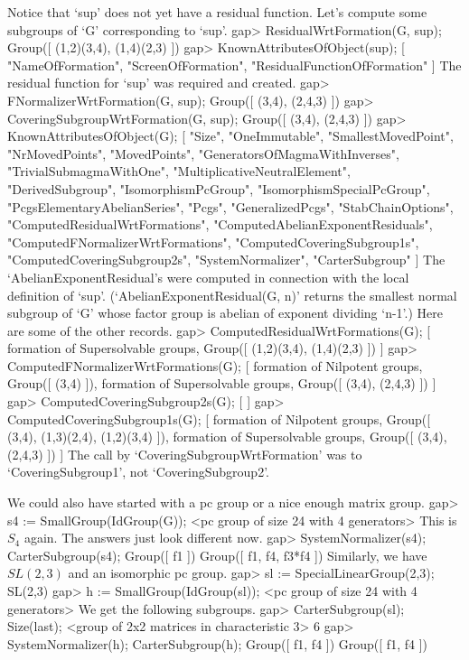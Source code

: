 Notice that `sup' does not yet have a residual function.
 Let's compute some subgroups of `G' corresponding to `sup'.
\beginexample
gap> ResidualWrtFormation(G, sup);
Group([ (1,2)(3,4), (1,4)(2,3) ])
gap> KnownAttributesOfObject(sup);
[ "NameOfFormation", "ScreenOfFormation", "ResidualFunctionOfFormation" ]
\endexample
 The residual function for `sup' was required and created.
\beginexample
gap> FNormalizerWrtFormation(G, sup);
Group([ (3,4), (2,4,3) ])
gap> CoveringSubgroupWrtFormation(G, sup);
Group([ (3,4), (2,4,3) ])
gap> KnownAttributesOfObject(G);
[ "Size", "OneImmutable", "SmallestMovedPoint", "NrMovedPoints", 
  "MovedPoints", "GeneratorsOfMagmaWithInverses", "TrivialSubmagmaWithOne", 
  "MultiplicativeNeutralElement", "DerivedSubgroup", "IsomorphismPcGroup", 
  "IsomorphismSpecialPcGroup", "PcgsElementaryAbelianSeries", "Pcgs", 
  "GeneralizedPcgs", "StabChainOptions", "ComputedResidualWrtFormations", 
  "ComputedAbelianExponentResiduals", "ComputedFNormalizerWrtFormations", 
  "ComputedCoveringSubgroup1s", "ComputedCoveringSubgroup2s", 
  "SystemNormalizer", "CarterSubgroup" ]
\endexample
 The `AbelianExponentResidual's were computed in connection with the
local definition of `sup'. (`AbelianExponentResidual(G, n)' returns
the smallest normal subgroup of `G' whose factor group is abelian of
exponent dividing `n-1'.) Here are some of the other records.
\beginexample
gap> ComputedResidualWrtFormations(G);
[ formation of Supersolvable groups, Group([ (1,2)(3,4), (1,4)(2,3) ]) ]
gap> ComputedFNormalizerWrtFormations(G);
[ formation of Nilpotent groups, Group([ (3,4) ]), 
  formation of Supersolvable groups, Group([ (3,4), (2,4,3) ]) ]
gap> ComputedCoveringSubgroup2s(G);
[  ]
gap> ComputedCoveringSubgroup1s(G);
[ formation of Nilpotent groups, Group([ (3,4), (1,3)(2,4), (1,2)(3,4) ]), 
  formation of Supersolvable groups, Group([ (3,4), (2,4,3) ]) ]
\endexample
The call by `CoveringSubgroupWrtFormation' was to `CoveringSubgroup1', not
`CoveringSubgroup2'.

We could also have started with a pc group or a nice enough matrix group.
\beginexample
gap> s4 := SmallGroup(IdGroup(G));
<pc group of size 24 with 4 generators>
\endexample
This is $S_4$ again. The answers just look different now.
\beginexample
gap> SystemNormalizer(s4); CarterSubgroup(s4);
Group([ f1 ])
Group([ f1, f4, f3*f4 ])
\endexample
Similarly, we have $SL(2,3)$ and an isomorphic pc group.
\beginexample
gap> sl := SpecialLinearGroup(2,3);
SL(2,3)
gap> h := SmallGroup(IdGroup(sl));
<pc group of size 24 with 4 generators>
\endexample
We get the following subgroups.
\beginexample
gap> CarterSubgroup(sl); Size(last);
<group of 2x2 matrices in characteristic 3>
6
gap> SystemNormalizer(h); CarterSubgroup(h);
Group([ f1, f4 ])
Group([ f1, f4 ])
\endexample

